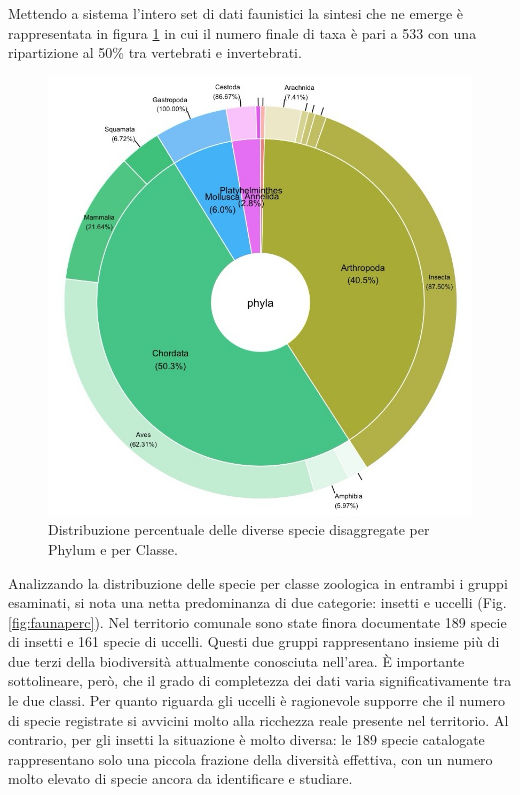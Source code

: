 \documentclass[
]{book}
\begin{document}
Mettendo a sistema l'intero set di dati faunistici la sintesi che ne emerge è rappresentata in figura \ref{fig:faunaSpoletoAll} in cui il numero finale di taxa è pari a 533 con una ripartizione al 50\% tra vertebrati e invertebrati.

\begin{figure}

{\centering \includegraphics[width=\linewidth]{./figs/faunaSpoletoAll} 

}

\caption{Distribuzione percentuale delle diverse specie disaggregate per Phylum e per Classe.}\label{fig:faunaSpoletoAll}
\end{figure}

Analizzando la distribuzione delle specie per classe zoologica in entrambi i gruppi esaminati, si nota una netta predominanza di due categorie: insetti e uccelli (Fig. \ref{fig:faunaperc}).
Nel territorio comunale sono state finora documentate 189 specie di insetti e 161 specie di uccelli.
Questi due gruppi rappresentano insieme più di due terzi della biodiversità attualmente conosciuta nell'area.
È importante sottolineare, però, che il grado di completezza dei dati varia significativamente tra le due classi.
Per quanto riguarda gli uccelli è ragionevole supporre che il numero di specie registrate si avvicini molto alla ricchezza reale presente nel territorio.
Al contrario, per gli insetti la situazione è molto diversa: le 189 specie catalogate rappresentano solo una piccola frazione della diversità effettiva, con un numero molto elevato di specie ancora da identificare e studiare.
\end{document}
